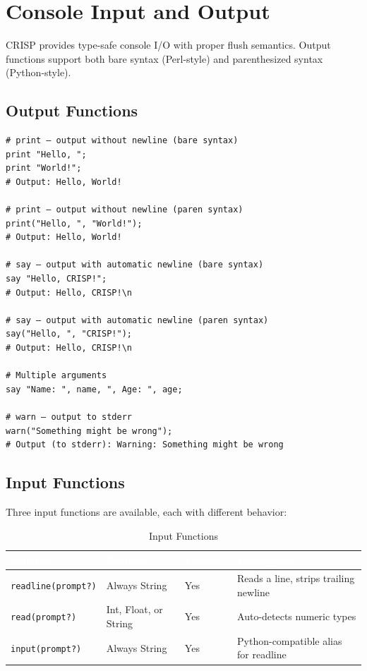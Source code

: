 \section{Console Input and Output}

CRISP provides type-safe console I/O with proper flush semantics. Output functions support both bare syntax (Perl-style) and parenthesized syntax (Python-style).

\subsection{Output Functions}

\begin{tcolorbox}[colback=codebg, colframe=darkpurple, colbacktitle=darkpurple, title=\textbf{\textcolor{codegold}{Output Functions}}, fonttitle=\bfseries, sharp corners]
\begin{lstlisting}
# print — output without newline (bare syntax)
print "Hello, ";
print "World!";
# Output: Hello, World!

# print — output without newline (paren syntax)
print("Hello, ", "World!");
# Output: Hello, World!

# say — output with automatic newline (bare syntax)
say "Hello, CRISP!";
# Output: Hello, CRISP!\n

# say — output with automatic newline (paren syntax)
say("Hello, ", "CRISP!");
# Output: Hello, CRISP!\n

# Multiple arguments
say "Name: ", name, ", Age: ", age;

# warn — output to stderr
warn("Something might be wrong");
# Output (to stderr): Warning: Something might be wrong
\end{lstlisting}
\end{tcolorbox}

\subsection{Input Functions}

Three input functions are available, each with different behavior:

\begin{table}[H]
\centering
{}
\caption{\textcolor{darkpurple}{Input Functions}}
\vspace{0.3em}
\begin{tabular}{@{}lllp{6cm}@{}}
\toprule
\rowcolor{softvioletdark}
\textbf{\textcolor{white}{Function}} & \textbf{\textcolor{white}{Returns}} & \textbf{\textcolor{white}{Flushes?}} & \textbf{\textcolor{white}{Description}} \\
\midrule
\texttt{readline(prompt?)} & Always String & Yes & Reads a line, strips trailing newline \\
\texttt{read(prompt?)} & Int, Float, or String & Yes & Auto-detects numeric types \\
\texttt{input(prompt?)} & Always String & Yes & Python-compatible alias for readline \\
\bottomrule
\end{tabular}
\end{table}


